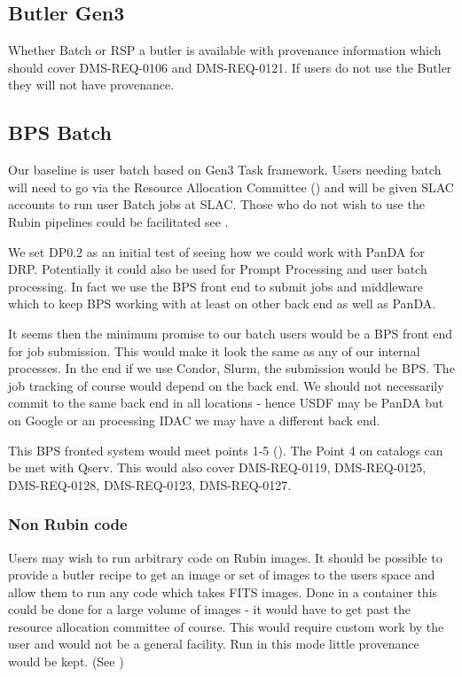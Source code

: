 \subsection{Butler Gen3} \label{sec:gen3}

Whether Batch or RSP a butler is available with provenance information which should cover DMS-REQ-0106 and DMS-REQ-0121.
If users do not use the Butler they will not have provenance.

\subsection{BPS Batch }\label{sec:bpsbatch}

Our baseline is user batch based on Gen3 Task framework.
Users needing batch will need to go via the Resource Allocation Committee () and
will be given SLAC accounts to run user Batch jobs at SLAC.
Those who do not wish to use the Rubin pipelines could be facilitated see .


We set DP0.2 as an initial test of seeing how we could work with PanDA 
for DRP. Potentially it could also be used for Prompt Processing and user batch processing.
In fact we use the BPS front end to submit jobs and middleware which to keep BPS working with at least on other back end as well as PanDA.

It seems then the minimum promise to our batch users would be a BPS front end for job submission.
This would make it look the same as any of our internal processes.
In the end if we use Condor, Slurm, the submission would be BPS.
The job tracking of course would depend on the back end.
We should not necessarily commit to the same back end in all locations - hence USDF may be PanDA but on Google or an processing IDAC we may have a different back end.

This BPS fronted system would meet  points 1-5 (). The Point 4 on catalogs can be met with Qserv.
This would also cover DMS-REQ-0119, DMS-REQ-0125, DMS-REQ-0128, DMS-REQ-0123, DMS-REQ-0127.


\subsubsection{Non Rubin code} \label{sec:othercode}
Users may wish to run arbitrary code on Rubin images.
It should be possible to provide a butler recipe to get an image or set of images to the users space and allow them to run any code which takes FITS images.
Done in a container this could be done for a large volume of images - it would have to get past  the resource allocation committee of course.
This would require custom work by the user and would not be a general facility.
Run in this mode little provenance would be kept.  (See )


